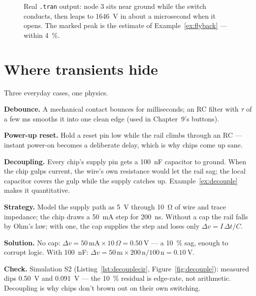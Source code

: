 \begin{figure}[htbp]
\centering

\caption{Real \texttt{.tran} output: node 3 sits near ground while the switch
conducts, then leaps to \qty{1646}{\volt} in about a microsecond when it
opens. The marked peak is the estimate of Example~\ref{ex:flyback} — within
\qty{4}{\percent}.}
\label{fig:flyback}
\end{figure}

\section{Where transients hide}
\label{sec:hiding}

Three everyday cases, one physics.

\textbf{Debounce.} A mechanical contact bounces for milliseconds; an RC
filter with $\tau$ of a few ms smooths it into one clean edge (used in
Chapter~9's buttons).

\textbf{Power-up reset.} Hold a reset pin low while the rail climbs through
an RC — instant power-on becomes a deliberate delay, which is why chips come
up sane.

\textbf{Decoupling.} Every chip's supply pin gets a \qty{100}{\nano\farad}
capacitor to ground. When the chip gulps current, the wire's own resistance
would let the rail sag; the local capacitor covers the gulp while the supply
catches up. Example~\ref{ex:decouple} makes it quantitative.

\begin{example}
\label{ex:decouple}
\textbf{Strategy.} Model the supply path as \qty{5}{\volt} through
\qty{10}{\ohm} of wire and trace impedance; the chip draws a
\qty{50}{\milli\ampere} step for \qty{200}{\nano\second}. Without a cap the
rail falls by Ohm's law; with one, the cap supplies the step and loses only
$\Delta v = I\,\Delta t/C$.

\textbf{Solution.} No cap: $\Delta v=50\,\mathrm{mA}\times10\,\Omega
=\qty{0.50}{\volt}$ — a \qty{10}{\percent} sag, enough to corrupt logic.
With \qty{100}{\nano\farad}: $\Delta v=50\,\mathrm{m}\times200\,\mathrm{n}
/100\,\mathrm{n}=\qty{0.10}{\volt}$.

\textbf{Check.} Simulation S2 (Listing~\ref{lst:decouplecir},
Figure~\ref{fig:decouple}): measured dips \qty{0.50}{\volt} and
\qty{0.091}{\volt} — the \qty{10}{\percent} residual is edge-rate, not
arithmetic. Decoupling is why chips don't brown out on their own switching.
\end{example}

